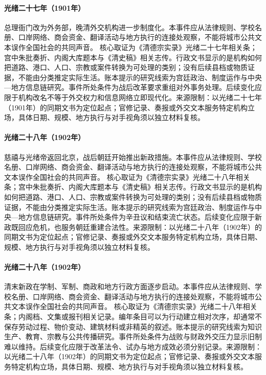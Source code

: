 \hypertarget{civic:EQ-1901-ZONGLI-YAMEN-REPLACED}{}\paragraph{光绪二十七年（1901年）}总理衙门改为外务部，晚清外交机构进一步制度化。本事件应从法律规则、学校名册、口岸网络、商会资金、翻译活动与地方执行的连接处观察，不能将城市公共文本误作全国社会的共同声音。 核心取证为《清德宗实录》光绪二十七年相关条；宫中朱批奏折、内阁大库题本与《清史稿》相关志传。行政文书显示的是机构如何把道路、港口、人口、宗教或案件转换为可处理的类别；没有后续县档或物质证据，不能由分类推定实际生活。账本提示的研究线索为宫廷政治、制度运作与中央—地方信息链研究。事件所处条件为战后改革要求重组对外事务处理。后续变化应限于机构改名不等于外交权力和信息网络立即现代化。来源限制：以光绪二十七年（1901年）的同期文书为定位起点；官修记录、奏报或外交文本服务特定机构立场，具体日期、规模、地方执行与对手视角须以独立材料复核。
\hypertarget{civic:EQ-1902-CIXI-RETURN-BEIJING}{}\paragraph{光绪二十八年（1902年）}慈禧与光绪帝返回北京，战后朝廷开始推出新政措施。本事件应从法律规则、学校名册、口岸网络、商会资金、翻译活动与地方执行的连接处观察，不能将城市公共文本误作全国社会的共同声音。 核心取证为《清德宗实录》光绪二十八年相关条；宫中朱批奏折、内阁大库题本与《清史稿》相关志传。行政文书显示的是机构如何把道路、港口、人口、宗教或案件转换为可处理的类别；没有后续县档或物质证据，不能由分类推定实际生活。账本提示的研究线索为宫廷政治、制度运作与中央—地方信息链研究。事件所处条件为辛丑议和结束流亡状态。后续变化应限于新政既回应危机，也服务朝廷重建合法性。来源限制：以光绪二十八年（1902年）的同期文书为定位起点；官修记录、奏报或外交文本服务特定机构立场，具体日期、规模、地方执行与对手视角须以独立材料复核。
\hypertarget{civic:EQ-1902-NEW-POLICIES-EDUCATION}{}\paragraph{光绪二十八年（1902年）}清末新政在学制、军制、商政和地方行政方面逐步启动。本事件应从法律规则、学校名册、口岸网络、商会资金、翻译活动与地方执行的连接处观察，不能将城市公共文本误作全国社会的共同声音。 核心取证为《清德宗实录》光绪二十八年相关条；内阁档、文集或报刊相关记录。编年条目可以为行动建立相对次序，却通常不保存劳动过程、物价变动、建筑材料或非精英的叙述。账本提示的研究线索为知识生产、教育、宗教与公共传播研究。事件所处条件为战败与财政外交压力显示旧制难以维持。后续变化应限于改革法令、试办与地方成效必须分别记录。来源限制：以光绪二十八年（1902年）的同期文书为定位起点；官修记录、奏报或外交文本服务特定机构立场，具体日期、规模、地方执行与对手视角须以独立材料复核。
